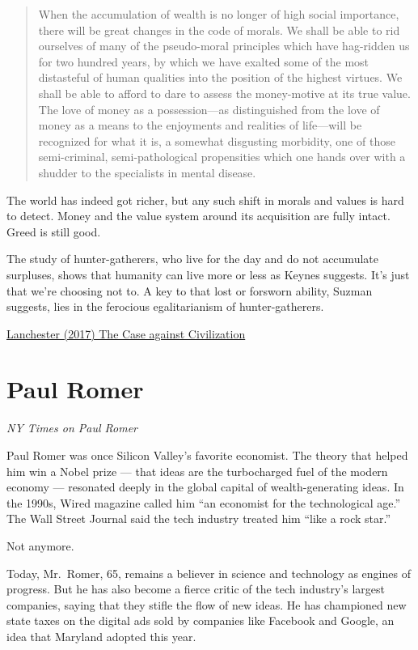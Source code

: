 \documentclass[
]{book}
\begin{document}
\begin{quote}
When the accumulation of wealth is no longer of high social importance, there will be great changes in the code of morals. We shall be able to rid ourselves of many of the pseudo-moral principles which have hag-ridden us for two hundred years, by which we have exalted some of the most distasteful of human qualities into the position of the highest virtues. We shall be able to afford to dare to assess the money-motive at its true value. The love of money as a possession---as distinguished from the love of money as a means to the enjoyments and realities of life---will be recognized for what it is, a somewhat disgusting morbidity, one of those semi-criminal, semi-pathological propensities which one hands over with a shudder to the specialists in mental disease.
\end{quote}

The world has indeed got richer, but any such shift in morals and values is hard to detect. Money and the value system around its acquisition are fully intact. Greed is still good.

The study of hunter-gatherers, who live for the day and do not accumulate surpluses, shows that humanity can live more or less as Keynes suggests. It's just that we're choosing not to. A key to that lost or forsworn ability, Suzman suggests, lies in the ferocious egalitarianism of hunter-gatherers.

\href{https://www.newyorker.com/magazine/2017/09/18/the-case-against-civilization}{Lanchester (2017) The Case against Civilization}

\hypertarget{paul-romer}{%
\section{Paul Romer}\label{paul-romer}}

\emph{NY Times on Paul Romer}

Paul Romer was once Silicon Valley's favorite economist. The theory that helped him win a Nobel prize --- that ideas are the turbocharged fuel of the modern economy --- resonated deeply in the global capital of wealth-generating ideas. In the 1990s, Wired magazine called him ``an economist for the technological age.'' The Wall Street Journal said the tech industry treated him ``like a rock star.''

Not anymore.

Today, Mr.~Romer, 65, remains a believer in science and technology as engines of progress. But he has also become a fierce critic of the tech industry's largest companies, saying that they stifle the flow of new ideas. He has championed new state taxes on the digital ads sold by companies like Facebook and Google, an idea that Maryland adopted this year.
\end{document}
